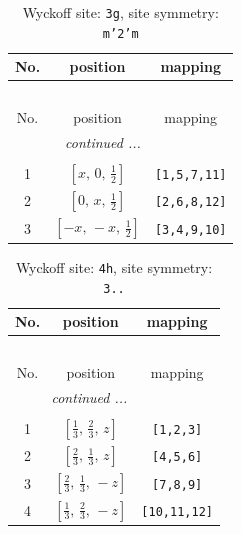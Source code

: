 \documentclass[fleqn,8pt]{jsarticle}
\begin{document}
\begin{longtable}{ccc}
\caption{Wyckoff site: {\tt 3g}, site symmetry: {\tt m'2'm}}
 \\
 \hline \hline
No. & position & mapping \\ \hline \endfirsthead

\multicolumn{2}{l}{\tablename\ \thetable{}} \\
 \hline \hline
No. & position & mapping \\ \hline \endhead

 \hline \hline
\multicolumn{2}{r}{\footnotesize\it continued ...} \\ \endfoot

 \hline \hline
\multicolumn{2}{r}{} \\ \endlastfoot

1 & $\left[ x,\, 0,\, \frac{1}{2} \right]$ & {\tt [1,5,7,11]} \\ \hline
2 & $\left[ 0,\, x,\, \frac{1}{2} \right]$ & {\tt [2,6,8,12]} \\ \hline
3 & $\left[ - x,\, - x,\, \frac{1}{2} \right]$ & {\tt [3,4,9,10]} \\
\end{longtable}
\renewcommand{\arraystretch}{1.2}
\begin{longtable}{ccc}
\caption{Wyckoff site: {\tt 4h}, site symmetry: {\tt 3..}}
 \\
 \hline \hline
No. & position & mapping \\ \hline \endfirsthead

\multicolumn{2}{l}{\tablename\ \thetable{}} \\
 \hline \hline
No. & position & mapping \\ \hline \endhead

 \hline \hline
\multicolumn{2}{r}{\footnotesize\it continued ...} \\ \endfoot

 \hline \hline
\multicolumn{2}{r}{} \\ \endlastfoot

1 & $\left[ \frac{1}{3},\, \frac{2}{3},\, z \right]$ & {\tt [1,2,3]} \\ \hline
2 & $\left[ \frac{2}{3},\, \frac{1}{3},\, z \right]$ & {\tt [4,5,6]} \\ \hline
3 & $\left[ \frac{2}{3},\, \frac{1}{3},\, - z \right]$ & {\tt [7,8,9]} \\ \hline
4 & $\left[ \frac{1}{3},\, \frac{2}{3},\, - z \right]$ & {\tt [10,11,12]} \\
\end{longtable}
\end{document}
